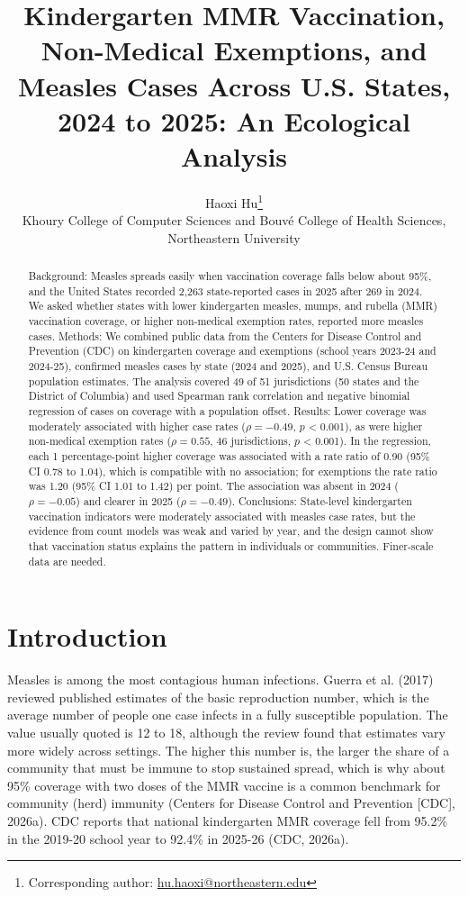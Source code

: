\documentclass[12pt]{article}
\title{Kindergarten MMR Vaccination, Non-Medical Exemptions, and Measles Cases Across U.S. States, 2024 to 2025: An Ecological Analysis}
\author{Haoxi Hu\thanks{Corresponding author: \href{mailto:hu.haoxi@northeastern.edu}{hu.haoxi@northeastern.edu}}\\[2pt]
\small Khoury College of Computer Sciences and Bouv\'e College of Health Sciences,\\
\small Northeastern University}
\date{}
\begin{document}
\maketitle
\vspace{-2em}
\begin{abstract}
Background: Measles spreads easily when vaccination coverage falls below about 95\%, and the United States recorded 2,263 state-reported cases in 2025 after 269 in 2024. We asked whether states with lower kindergarten measles, mumps, and rubella (MMR) vaccination coverage, or higher non-medical exemption rates, reported more measles cases. Methods: We combined public data from the Centers for Disease Control and Prevention (CDC) on kindergarten coverage and exemptions (school years 2023-24 and 2024-25), confirmed measles cases by state (2024 and 2025), and U.S. Census Bureau population estimates. The analysis covered 49 of 51 jurisdictions (50 states and the District of Columbia) and used Spearman rank correlation and negative binomial regression of cases on coverage with a population offset. Results: Lower coverage was moderately associated with higher case rates ($\rho = -0.49$, $p$ < 0.001), as were higher non-medical exemption rates ($\rho = 0.55$, 46 jurisdictions, $p$ < 0.001). In the regression, each 1 percentage-point higher coverage was associated with a rate ratio of 0.90 (95\% CI 0.78 to 1.04), which is compatible with no association; for exemptions the rate ratio was 1.20 (95\% CI 1.01 to 1.42) per point. The association was absent in 2024 ($\rho = -0.05$) and clearer in 2025 ($\rho = -0.49$). Conclusions: State-level kindergarten vaccination indicators were moderately associated with measles case rates, but the evidence from count models was weak and varied by year, and the design cannot show that vaccination status explains the pattern in individuals or communities. Finer-scale data are needed.
\end{abstract}

\section*{Introduction}
Measles is among the most contagious human infections. Guerra et al. (2017) reviewed published estimates of the basic reproduction number, which is the average number of people one case infects in a fully susceptible population. The value usually quoted is 12 to 18, although the review found that estimates vary more widely across settings. The higher this number is, the larger the share of a community that must be immune to stop sustained spread, which is why about 95\% coverage with two doses of the MMR vaccine is a common benchmark for community (herd) immunity (Centers for Disease Control and Prevention [CDC], 2026a). CDC reports that national kindergarten MMR coverage fell from 95.2\% in the 2019-20 school year to 92.4\% in 2025-26 (CDC, 2026a).
\end{document}
